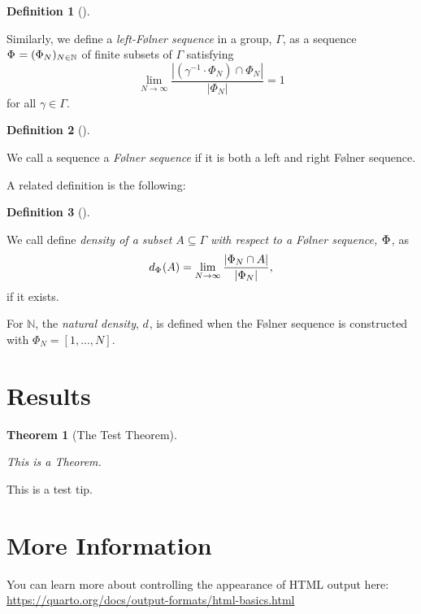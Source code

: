 \documentclass[
  british,
]{article}
\theoremstyle{definition}
\newtheorem{definition}{Definition}[section]
\theoremstyle{plain}
\newtheorem{theorem}{Theorem}[section]
\theoremstyle{remark}
\newcommand{\Group}{{\Gamma}}
\newcommand{\Folner}[1][\vphantom{}]{{\Phi}_{#1}}
\newcommand{\N}{\mathbb{N}}
\newcommand{\GroupElement}{{\gamma}}
\newcommand{\Density}[1][\Folner]{{d}_{#1}}
\newcommand{\Inverse}[1]{{#1}^{-1}}
\begin{document}
\begin{definition}[]\protect\hypertarget{def-leftFolner}{}\label{def-leftFolner}

Similarly, we define a \emph{left-Følner sequence} in a group,
\(\Group\), as a sequence \(\Folner =(\Folner[N])_{N\in\mathbb{N}}\) of
finite subsets of \(\Gamma\) satisfying
\[\lim_{N\rightarrow\infty}\frac{|(\Inverse{\GroupElement}\cdot\Folner[N])\cap\Folner[N]|}{|\Folner[N]|}=1 \]for
all \(\GroupElement\in\Group\).

\end{definition}

\begin{definition}[]\protect\hypertarget{def-Folner}{}\label{def-Folner}

We call a sequence a \emph{Følner sequence} if it is both a left and
right Følner sequence.

\end{definition}

A related definition is the following:

\begin{definition}[]\protect\hypertarget{def-Density}{}\label{def-Density}

We call define \emph{density of a subset \(A\subseteq\Group\) with
respect to a Følner sequence, \(\Folner\),} as
\[\Density(A)=\lim_{N\rightarrow\infty}\frac{|\Folner[N]\cap A|}{|\Folner[N]|},\]
if it exists.

\end{definition}

For \(\N\), the \emph{natural density}, \(\Density[]\), is defined when
the Følner sequence is constructed with \(\Folner[N]=[1,...,N]\).

\section{Results}\label{results}

\begin{theorem}[The Test
Theorem]\protect\hypertarget{thm-Test}{}\label{thm-Test}

This is a Theorem.

\end{theorem}

\begin{tcolorbox}[enhanced jigsaw, breakable, colbacktitle=quarto-callout-tip-color!10!white, titlerule=0mm, opacityback=0, colframe=quarto-callout-tip-color-frame, coltitle=black, bottomtitle=1mm, opacitybacktitle=0.6, leftrule=.75mm, toptitle=1mm, bottomrule=.15mm, rightrule=.15mm, title=\textcolor{quarto-callout-tip-color}{\faLightbulb}\hspace{0.5em}{Tip}, arc=.35mm, toprule=.15mm, left=2mm, colback=white]

This is a test tip.

\end{tcolorbox}

\section{More Information}\label{more-information}

You can learn more about controlling the appearance of HTML output here:
\url{https://quarto.org/docs/output-formats/html-basics.html}
\end{document}
